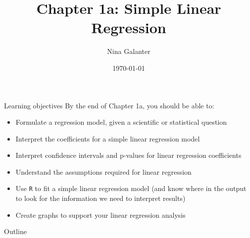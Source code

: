 \documentclass[10pt,t]{beamer}
\title{Chapter 1a: Simple Linear Regression}
\author{Nina Galanter}
\date{\today}
\begin{document}
	\begin{frame}
	\titlepage 
\end{frame}

\begin{frame}{Learning objectives}
By the end of Chapter 1a, you should be able to:
\begin{itemize}
	\item Formulate a regression model, given a scientific or statistical question
	\item Interpret the coefficients for a simple linear regression model
	\item Interpret confidence intervals and p-values for linear regression coefficients
	\item Understand the assumptions required for linear regression
	\item Use \texttt{R} to fit a simple linear regression model (and know where in the output to look for the information we need to interpret results)
	\item Create graphs to support your linear regression analysis
\end{itemize}
\end{frame}

\begin{frame}{Outline}
\tableofcontents
\end{frame}


\end{document}
